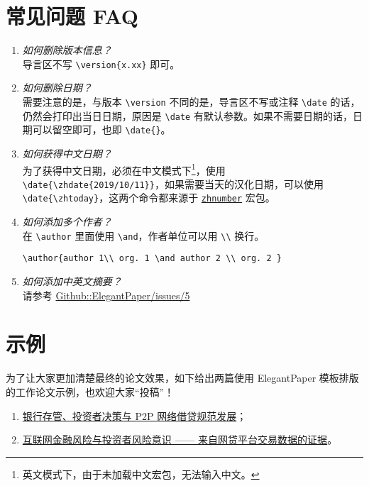 \documentclass[lang=cn,11pt,a4paper]{elegantpaper}
\begin{document}
\section{常见问题 FAQ}

\begin{enumerate}[label=\arabic*).]
  \item \textit{如何删除版本信息？}\\
      导言区不写 \lstinline|\version{x.xx}| 即可。
  \item \textit{如何删除日期？}\\
      需要注意的是，与版本 \lstinline{\version} 不同的是，导言区不写或注释 \lstinline{\date} 的话，仍然会打印出当日日期，原因是 \lstinline{\date} 有默认参数。如果不需要日期的话，日期可以留空即可，也即 \lstinline|\date{}|。
  \item \textit{如何获得中文日期？}\\
      为了获得中文日期，必须在中文模式下\footnote{英文模式下，由于未加载中文宏包，无法输入中文。}，使用 \lstinline|\date{\zhdate{2019/10/11}}|，如果需要当天的汉化日期，可以使用 \lstinline|\date{\zhtoday}|，这两个命令都来源于 \href{https://ctan.org/pkg/zhnumber}{\lstinline{zhnumber}} 宏包。
  \item \textit{如何添加多个作者？}\\
      在 \lstinline{\author} 里面使用 \lstinline{\and}，作者单位可以用 \lstinline{\\} 换行。\begin{lstlisting}
\author{author 1\\ org. 1 \and author 2 \\ org. 2 }
\end{lstlisting}
  \item \textit{如何添加中英文摘要？}\\
      请参考 \href{https://github.com/ElegantLaTeX/ElegantPaper/issues/5}{Github::ElegantPaper/issues/5}
\end{enumerate}

\section{示例}

为了让大家更加清楚最终的论文效果，如下给出两篇使用 ElegantPaper 模板排版的工作论文示例，也欢迎大家“投稿”！

\begin{enumerate}
  \item \href{https://github.com/EthanDeng/bank-custody}{银行存管、投资者决策与 P2P 网络借贷规范发展}；
  \item \href{https://github.com/EthanDeng/risk-awareness}{互联网金融风险与投资者风险意识 —— 来自网贷平台交易数据的证据}。
\end{enumerate}
\end{document}
